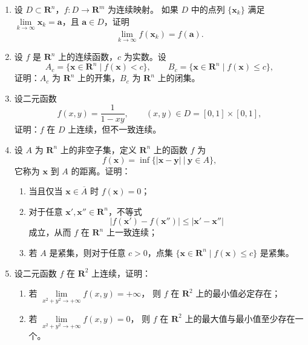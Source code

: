 \documentclass[11pt]{ctexart}
\theoremstyle{plain}
\theoremstyle{definition}
\theoremstyle{remark}
\begin{document}
\begin{enumerate}
  \item 设 \(D\subset\mathbf{R}^n\)，\(f\colon D\to\mathbf{R}^m\) 为连续映射。
        如果 \(D\) 中的点列 \(\{\boldsymbol{x}_k\}\) 满足
        \(\lim\limits_{k\to\infty}\boldsymbol{x}_k=\boldsymbol{a}\)，且
        \(\boldsymbol{a}\in D\)，证明
        \[
          \lim_{k\to\infty}f(\boldsymbol{x}_k)=f(\boldsymbol{a}).
        \]
  \item 设 \(f\) 是 \(\mathbf{R}^n\) 上的连续函数，\(c\) 为实数。设
        \[
          A_c=\{\boldsymbol{x}\in\mathbf{R}^n\mid f(\boldsymbol{x})<c\},\qquad
          B_c=\{\boldsymbol{x}\in\mathbf{R}^n\mid f(\boldsymbol{x})\le c\},
        \]
        证明：\(A_c\) 为 \(\mathbf{R}^n\) 上的开集，\(B_c\) 为 \(\mathbf{R}^n\) 上的闭集。
  \item 设二元函数
        \[
          f(x,y)=\frac{1}{1-xy},\qquad (x,y)\in D=[0,1]\times[0,1],
        \]
        证明：\(f\) 在 \(D\) 上连续，但不一致连续。
  \item 设 \(A\) 为 \(\mathbf{R}^n\) 上的非空子集，定义 \(\mathbf{R}^n\) 上的函数 \(f\) 为
        \[
          f(\boldsymbol{x})=\inf\bigl\{|\boldsymbol{x}-\boldsymbol{y}|\ \big|\ \boldsymbol{y}\in A\bigr\},
        \]
        它称为 \(\boldsymbol{x}\) 到 \(A\) 的距离。证明：
        \begin{enumerate}
          \item[(1)] 当且仅当 \(\boldsymbol{x}\in\overline{A}\) 时 \(f(\boldsymbol{x})=0\)；
          \item[(2)] 对于任意 \(\boldsymbol{x}',\boldsymbol{x}''\in\mathbf{R}^n\)，不等式
                \[
                  |f(\boldsymbol{x}')-f(\boldsymbol{x}'')|
                  \le|\boldsymbol{x}'-\boldsymbol{x}''|
                \]
                成立，从而 \(f\) 在 \(\mathbf{R}^n\) 上一致连续；
          \item[(3)] 若 \(A\) 是紧集，则对于任意 \(c>0\)，点集
                \(\{\boldsymbol{x}\in\mathbf{R}^n\mid f(\boldsymbol{x})\le c\}\) 是紧集。
        \end{enumerate}
  \item 设二元函数 \(f\) 在 \(\mathbf{R}^2\) 上连续，证明：
        \begin{enumerate}
          \item[(1)] 若 \(\lim\limits_{x^2+y^2\to+\infty}f(x,y)=+\infty\)，
                则 \(f\) 在 \(\mathbf{R}^2\) 上的最小值必定存在；
          \item[(2)] 若 \(\lim\limits_{x^2+y^2\to+\infty}f(x,y)=0\)，
                则 \(f\) 在 \(\mathbf{R}^2\) 上的最大值与最小值至少存在一个。

\end{enumerate}
\end{enumerate}
\end{document}
